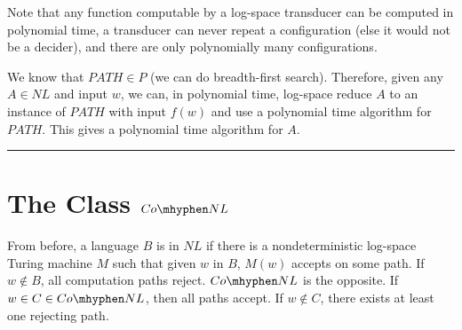 \documentclass[twoside]{article}
\newenvironment{proof}{{\bf Proof:}}{\hfill\rule{2mm}{2mm}}
\begin{document}
Note that any function computable by a log-space transducer can be computed in polynomial time, a transducer can never repeat a configuration (else it would not be a decider), and there are only polynomially many configurations.


\begin{proof}
	We know that $PATH \in P$ (we can do breadth-first search). Therefore, given any $A\in NL$ and input $w$, we can, in polynomial time, log-space reduce $A$ to an instance of $PATH$ with input $f(w)$ and use a polynomial time algorithm for $PATH$.  This gives a polynomial time algorithm for $A$.
\end{proof}
	



\section*{The Class $Co\mhyphen NL$}


From before, a language $B$ is in $NL$ if there is a nondeterministic log-space Turing machine $M$ such that given $w$ in $B$, $M(w)$ accepts on some path.  If $w\notin B$, all computation paths reject.  $Co\mhyphen NL$ is the opposite.  If $w\in C\in Co\mhyphen NL$, then all paths accept.  If $w\notin C$, there exists at least one rejecting path.


\end{document}
